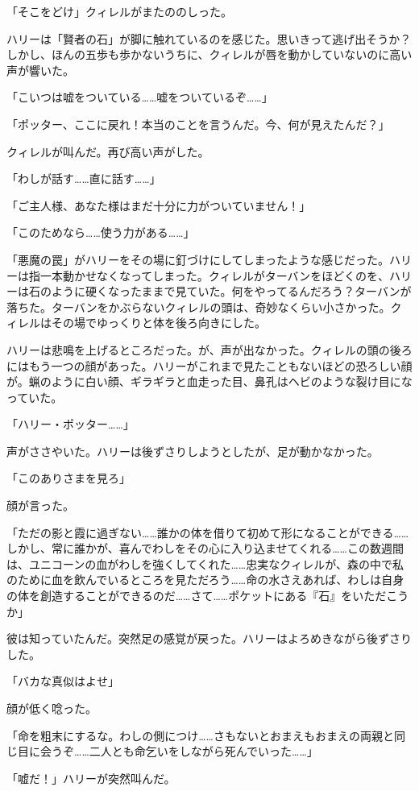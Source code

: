 \documentclass[10pt,a4paper]{article}
\begin{document}
\begin{CJK}{UTF8}{min}
「そこをどけ」クィレルがまたののしった。

ハリーは「賢者の石」が脚に触れているのを感じた。思いきって逃げ出そうか？しかし、ほんの五歩も歩かないうちに、クィレルが唇を動かしていないのに高い声が響いた。

「こいつは嘘をついている……嘘をついているぞ……」

「ポッター、ここに戻れ！本当のことを言うんだ。今、何が見えたんだ？」

クィレルが叫んだ。再び高い声がした。

「わしが話す……直に話す……」

「ご主人様、あなた様はまだ十分に力がついていません！」

「このためなら……使う力がある……」

「悪魔の罠」がハリーをその場に釘づけにしてしまったような感じだった。ハリーは指一本動かせなくなってしまった。クィレルがターバンをほどくのを、ハリーは石のように硬くなったままで見ていた。何をやってるんだろう？ターバンが落ちた。ターバンをかぶらないクィレルの頭は、奇妙なくらい小さかった。クィレルはその場でゆっくりと体を後ろ向きにした。

ハリーは悲鳴を上げるところだった。が、声が出なかった。クィレルの頭の後ろにはもう一つの顔があった。ハリーがこれまで見たこともないほどの恐ろしい顔が。蝋のように白い顔、ギラギラと血走った目、鼻孔はヘビのような裂け目になっていた。

「ハリー・ポッター……」

声がささやいた。ハリーは後ずさりしようとしたが、足が動かなかった。

「このありさまを見ろ」

顔が言った。

「ただの影と霞に過ぎない……誰かの体を借りて初めて形になることができる……しかし、常に誰かが、喜んでわしをその心に入り込ませてくれる……この数週間は、ユニコーンの血がわしを強くしてくれた……忠実なクィレルが、森の中で私のために血を飲んでいるところを見ただろう……命の水さえあれば、わしは自身の体を創造することができるのだ……さて……ポケットにある『石』をいただこうか」

彼は知っていたんだ。突然足の感覚が戻った。ハリーはよろめきながら後ずさりした。

「バカな真似はよせ」

顔が低く唸った。

「命を粗末にするな。わしの側につけ……さもないとおまえもおまえの両親と同じ目に会うぞ……二人とも命乞いをしながら死んでいった……」

「嘘だ！」ハリーが突然叫んだ。


\end{CJK}
\end{document}
